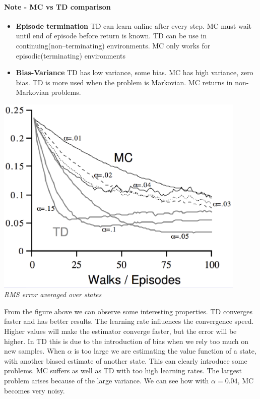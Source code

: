 \documentclass[main.tex]{subfiles}
\begin{document}
\paragraph{Note - MC vs TD comparison}
\begin{itemize}
    \item \textbf{Episode termination} TD can learn online after every step. MC must wait until end of episode before return is known. TD can be use in continuing(non–terminating) environments. MC only works for episodic(terminating) environments
    \item \textbf{Bias-Variance} TD has low variance, some bias. MC has high variance, zero bias. TD is more used when the problem is Markovian. MC returns in non-Markovian problems.
\end{itemize}
\begin{center}
    \includegraphics[width=120mm]{img/MCvsTD.PNG} \\
    \textit{RMS error averaged over states}
\end{center}
From the figure above we can observe some interesting properties. TD converges faster and has better results. The learning rate influences the convergence speed. Higher values will make the estimator converge faster, but the error will be higher. In TD this is due to the introduction of bias when we rely too much on new samples. When $\alpha$ is too large we are estimating the value function of a state, with another biased estimate of another state. This can clearly introduce some problems. MC suffers as well as TD with too high learning rates. The largest problem arises because of the large variance. We can see how with $\alpha=0.04$, MC becomes very noisy.
\end{document}
